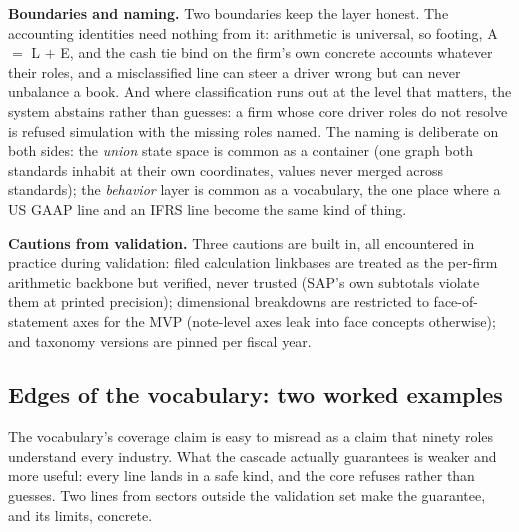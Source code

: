 \documentclass[11pt]{article}
\newcommand{\lead}[2]{\par\addvspace{5pt}\textbf{\textcolor{#1}{#2}}}
\begin{document}
\lead{navytwo}{Boundaries and naming.} Two boundaries keep the layer honest. The accounting identities need nothing from it: arithmetic is universal, so footing, A $=$ L $+$ E, and the cash tie bind on the firm's own concrete accounts whatever their roles, and a misclassified line can steer a driver wrong but can never unbalance a book. And where classification runs out at the level that matters, the system abstains rather than guesses: a firm whose core driver roles do not resolve is refused simulation with the missing roles named. The naming is deliberate on both sides: the \emph{union} state space is common as a container (one graph both standards inhabit at their own coordinates, values never merged across standards); the \emph{behavior} layer is common as a vocabulary, the one place where a US GAAP line and an IFRS line become the same kind of thing.

\lead{navytwo}{Cautions from validation.} Three cautions are built in, all encountered in practice during validation: filed calculation linkbases are treated as the per-firm arithmetic backbone but verified, never trusted (SAP's own subtotals violate them at printed precision); dimensional breakdowns are restricted to face-of-statement axes for the MVP (note-level axes leak into face concepts otherwise); and taxonomy versions are pinned per fiscal year.

\subsection{Edges of the vocabulary: two worked examples}
\label{sec:vocab-edges}
The vocabulary's coverage claim is easy to misread as a claim that ninety roles understand every industry. What the cascade actually guarantees is weaker and more useful: every line lands in a safe kind, and the core refuses rather than guesses. Two lines from sectors outside the validation set make the guarantee, and its limits, concrete.
\end{document}
